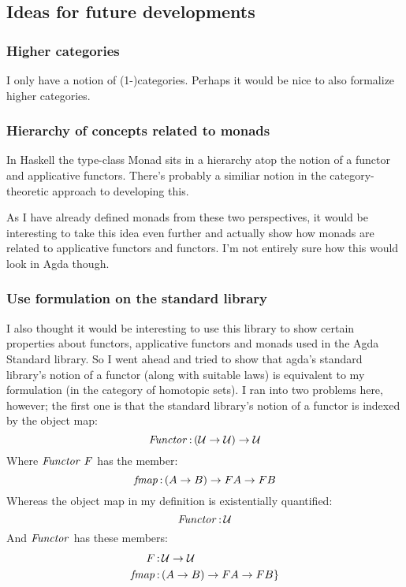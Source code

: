 \subsection{Ideas for future developments}
\subsubsection{Higher categories}
I only have a notion of (1-)categories. Perhaps it would be nice to also
formalize higher categories.

\subsubsection{Hierarchy of concepts related to monads}
In Haskell the type-class Monad sits in a hierarchy atop the notion of a functor
and applicative functors. There's probably a similiar notion in the
category-theoretic approach to developing this.

As I have already defined monads from these two perspectives, it would be
interesting to take this idea even further and actually show how monads are
related to applicative functors and functors. I'm not entirely sure how this
would look in Agda though.

\subsubsection{Use formulation on the standard library}
I also thought it would be interesting to use this library to show certain
properties about functors, applicative functors and monads used in the Agda
Standard library. So I went ahead and tried to show that agda's standard
library's notion of a functor (along with suitable laws) is equivalent to my
formulation (in the category of homotopic sets). I ran into two problems here,
however; the first one is that the standard library's notion of a functor is
indexed by the object map:
%
$$
\mathit{Functor} \,\mathord{:}\, (\mathcal{U} \to \mathcal{U}) \to \mathcal{U}
$$
%
Where $\mathit{Functor}\ F$ has the member:
%
$$
\mathit{fmap} \,\mathord{:}\, (A \to B) \to F A \to F B
$$
%
Whereas the object map in my definition is existentially quantified:
%
$$
\mathit{Functor} \,\mathord{:}\, \mathcal{U}
$$
%
And $\mathit{Functor}$ has these members:
\begin{align*}
F     & \,\mathord{:}\, \mathcal{U} \to \mathcal{U} \\
\mathit{fmap} & \,\mathord{:}\, (A \to B) \to F A \to F B\}
\end{align*}
%
